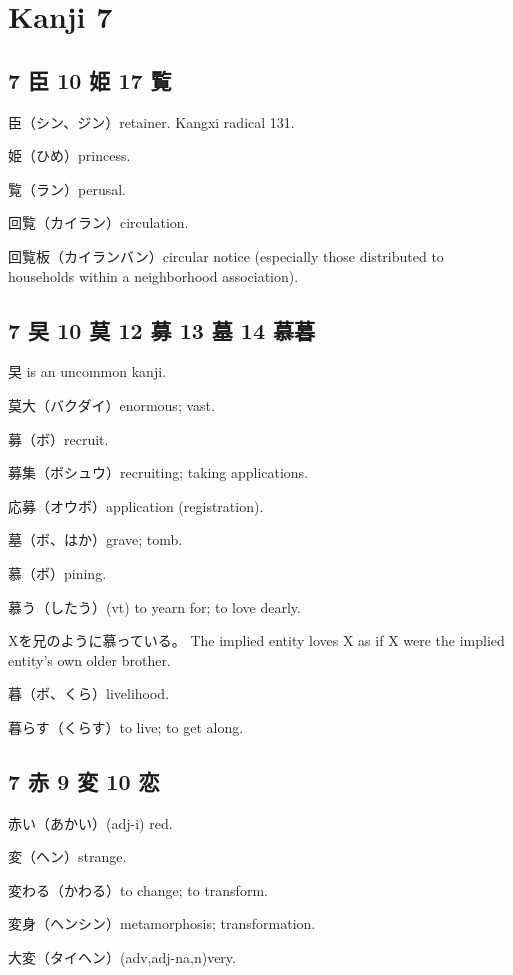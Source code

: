 \chapter{Kanji 7}

\section{7 臣 10 姫 17 覧}

臣（シン、ジン）retainer.
Kangxi radical 131.

姫（ひめ）princess.

覧（ラン）perusal.

回覧（カイラン）circulation.

回覧板（カイランバン）circular notice
(especially those distributed to households within a neighborhood association).

\section{7 旲 10 莫 12 募 13 墓 14 慕暮}

旲 is an uncommon kanji.

莫大（バクダイ）enormous; vast.

募（ボ）recruit.

募集（ボシュウ）recruiting; taking applications.

応募（オウボ）application (registration).

墓（ボ、はか）grave; tomb.

慕（ボ）pining.

慕う（したう）(vt) to yearn for; to love dearly.

Xを兄のように慕っている。
The implied entity loves X as if
X were the implied entity's own older brother.

暮（ボ、くら）livelihood.

暮らす（くらす）to live; to get along.

\section{7 赤 9 変 10 恋}

赤い（あかい）(adj-i) red.

変（ヘン）strange.

変わる（かわる）to change; to transform.

変身（ヘンシン）metamorphosis; transformation.

大変（タイヘン）(adv,adj-na,n)very.

